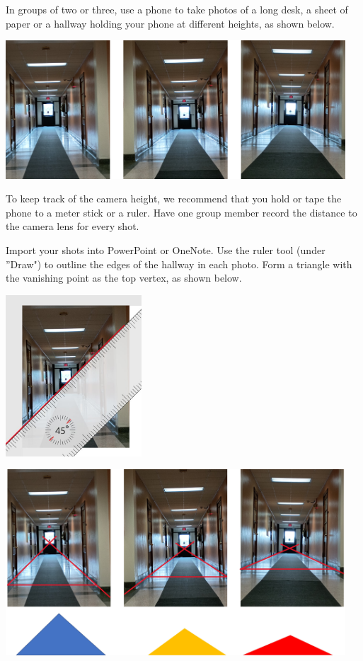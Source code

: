 \documentclass{ximera}
\begin{document}
\begin{exploration}\label{exp:hallway}
In groups of two or three, use a phone to take photos of a long desk, a sheet of paper or a hallway holding your phone at different heights, as shown below.

\begin{image}
         \includegraphics[width=5in]{threeHallways.jpg}
\end{image}

To keep track of the camera height, we recommend that you hold or tape the phone to a meter stick or a ruler. Have one group member record the distance to the camera lens for every shot.  

Import your shots into PowerPoint or OneNote.  Use the ruler tool (under ''Draw") to outline the edges of the hallway in each photo. Form a triangle with the vanishing point as the top vertex, as shown below.

\begin{image}
         \includegraphics[width=2in]{ruler.jpg}
\end{image}

\begin{image}
         \includegraphics[width=5in]{hallsAndTriangles.jpg}
\end{image}


\end{exploration}
\end{document}
